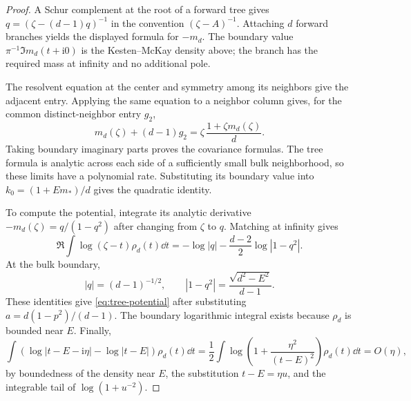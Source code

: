 \begin{proof}
A Schur complement at the root of a forward tree gives
\(q=(\zeta-(d-1)q)^{-1}\) in the convention \((\zeta-A)^{-1}\).
Attaching \(d\) forward branches yields the displayed formula for
\(-m_d\). The boundary value
\(\pi^{-1}\Im m_d(t+\mathrm i0)\) is the Kesten--McKay density above;
the branch has the required mass at infinity and no additional pole.

The resolvent equation at the center and symmetry among its neighbors
give the adjacent entry. Applying the same equation to a neighbor
column gives, for the common distinct-neighbor entry \(g_2\),
\[
 m_d(\zeta)+(d-1)g_2
       =\zeta\,\frac{1+\zeta m_d(\zeta)}d.
\]
Taking boundary imaginary parts proves the covariance formulas.
The tree formula is analytic across each side of a sufficiently small
bulk neighborhood, so these limits have a polynomial rate.
Substituting its boundary value into \(k_0=(1+Em_*)/d\) gives the
quadratic identity.

To compute the potential, integrate its analytic derivative
\(-m_d(\zeta)=q/(1-q^2)\) after changing from \(\zeta\) to \(q\).
Matching at infinity gives
\[
 \Re\int\log(\zeta-t)\rho_d(t)\dd t
       =-\log|q|-\frac{d-2}{2}\log|1-q^2|.
\]
At the bulk boundary,
\[
 |q|=(d-1)^{-1/2},\qquad
 |1-q^2|=\frac{\sqrt{d^2-E^2}}{d-1}.
\]
These identities give \eqref{eq:tree-potential} after substituting
\(a=d(1-p^2)/(d-1)\).
The boundary logarithmic integral exists because \(\rho_d\) is bounded
near \(E\). Finally,
\[
 \int \left(\log|t-E-\mathrm i\eta|-\log|t-E|\right)\rho_d(t)\dd t
 =\frac12\int\log\!\left(1+\frac{\eta^2}{(t-E)^2}\right)\rho_d(t)\dd t
 =O(\eta),
\]
by boundedness of the density near \(E\), the substitution
\(t-E=\eta u\), and the integrable tail of \(\log(1+u^{-2})\).
\end{proof}
